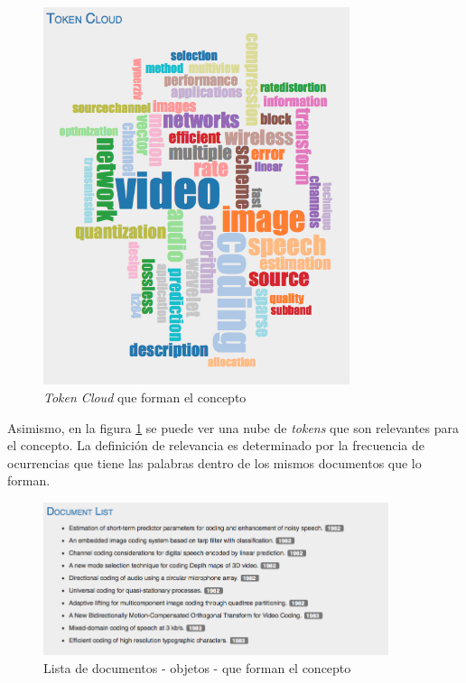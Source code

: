 \documentclass[12pt,oneside,letterpaper]{book}
\newcommand{\eng}[1]{\textit{#1}\xspace}			%
\theoremstyle{definition}
\begin{document}
 \begin{figure}[h!]
	\centering
	\includegraphics[width=0.8\textwidth]{images/results_8.png}
	\caption{\eng{Token Cloud} que forman el concepto}
	\label{fig:results_8}
\end{figure}

Asimismo, en la figura \ref{fig:results_8} se puede ver una nube de \eng{tokens} que son relevantes para el concepto. La definición de relevancia es determinado por la frecuencia de ocurrencias que tiene las palabras dentro de los mismos documentos que lo forman.

\newpage

 \begin{figure}[h!]
	\centering
	\includegraphics[width=0.9\textwidth]{images/results_9.png}
	\caption{Lista de documentos - objetos - que forman el concepto}
	\label{fig:results_9}
\end{figure}
\end{document}
